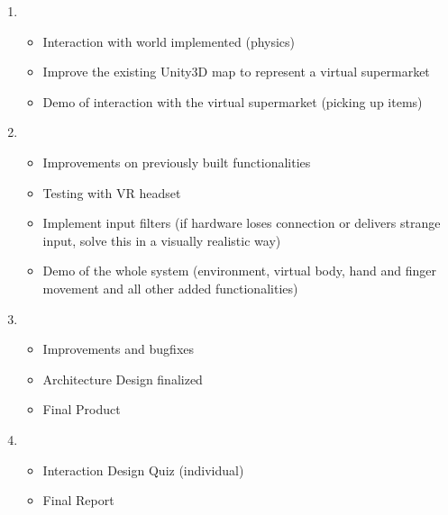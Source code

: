 \documentclass[11pt,a4paper]{report}
\begin{document}
\begin{enumerate}[label=\large{ \textbf{Sprint \arabic*}},leftmargin=3\parindent]
\item 
\begin{itemize}
\item Interaction with world implemented (physics)
\item Improve the existing Unity3D map to represent a virtual supermarket
\item Demo of interaction with the virtual supermarket (picking up items)
\end{itemize}
\item 
\begin{itemize}
\item Improvements on previously built functionalities
\item Testing with VR headset	
\item Implement input filters (if hardware loses connection or delivers strange input, solve this in a
visually realistic way)
\item Demo of the whole system (environment, virtual body, hand and finger movement and all other
added functionalities)
\end{itemize}
\item 
\begin{itemize}
\item Improvements and bugfixes
\item Architecture Design finalized
\item Final Product
\end{itemize}
\item 
\begin{itemize}
\item Interaction Design Quiz (individual)
\item Final Report
\end{itemize}
\end{enumerate}
\end{document}
